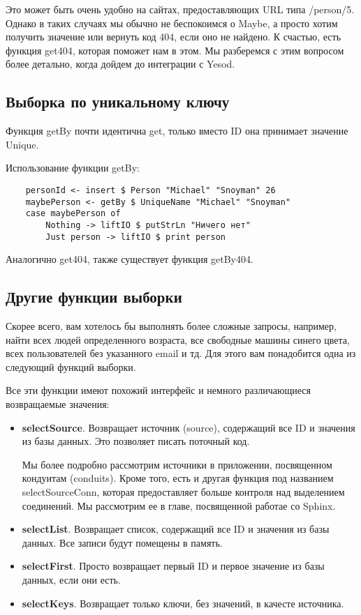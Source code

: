 Это может быть очень удобно на сайтах, предоставляющих URL типа /person/5. Однако в таких случаях мы обычно не беспокоимся о Maybe, а просто хотим получить значение или вернуть код 404, если оно не найдено. К счастью, есть функция get404, которая поможет нам в этом. Мы разберемся с этим вопросом более детально, когда дойдем до интеграции с Yesod. 

\subsection{Выборка по уникальному ключу} %

Функция getBy почти идентична get, только вместо ID она принимает значение Unique.

Использование функции getBy:

\begin{lstlisting}
    personId <- insert $ Person "Michael" "Snoyman" 26
    maybePerson <- getBy $ UniqueName "Michael" "Snoyman"
    case maybePerson of
        Nothing -> liftIO $ putStrLn "Ничего нет"
        Just person -> liftIO $ print person
\end{lstlisting}

Аналогично get404, также существует функция getBy404.

\subsection{Другие функции выборки} %

Скорее всего, вам хотелось бы выполнять более сложные запросы, например, найти всех людей определенного возраста, все свободные машины синего цвета, всех пользователей без указанного email и тд. Для этого вам понадобится одна из следующий функций выборки.

Все эти функции имеют похожий интерфейс и немного различающиеся возвращаемые значения: 

\begin{itemize}
\item {\bf selectSource}. Возвращает источник (source), содержащий все ID и значения из базы данных. Это позволяет писать поточный код.
\begin{remark}
Мы более подробно рассмотрим источники в приложении, посвященном кондуитам (conduits). Кроме того, есть и другая функция под названием selectSourceConn, которая предоставляет больше контроля над выделением соединений. Мы рассмотрим ее в главе, посвященной работае со Sphinx.
\end{remark}
\item {\bf selectList}. Возвращает список, содержащий все ID и значения из базы данных. Все записи будут помещены в память.
\item {\bf selectFirst}. Просто возвращает первый ID и первое значение из базы данных, если они есть.
\item {\bf selectKeys}. Возвращает только ключи, без значений, в качесте источника.
\end{itemize}

